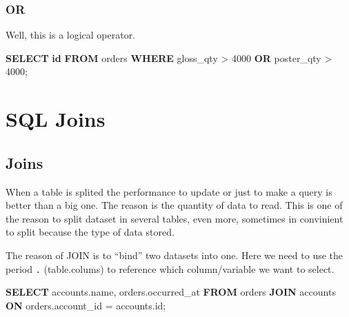 \documentclass[]{book}
\newenvironment{Shaded}{\begin{snugshade}}{\end{snugshade}}
\newcommand{\KeywordTok}[1]{\textcolor[rgb]{0.13,0.29,0.53}{\textbf{#1}}}
\newcommand{\DecValTok}[1]{\textcolor[rgb]{0.00,0.00,0.81}{#1}}
\newcommand{\StringTok}[1]{\textcolor[rgb]{0.31,0.60,0.02}{#1}}
\newcommand{\NormalTok}[1]{#1}
\begin{document}
\begin{Shaded}
\end{Shaded}

\subsubsection{OR}\label{or}

Well, this is a logical operator.

\begin{Shaded}
\begin{Highlighting}[]
\KeywordTok{SELECT} \KeywordTok{id}
\KeywordTok{FROM}\NormalTok{ orders}
\KeywordTok{WHERE}\NormalTok{ gloss_qty > }\DecValTok{4000} \KeywordTok{OR}\NormalTok{ poster_qty > }\DecValTok{4000}\NormalTok{;}
\end{Highlighting}
\end{Shaded}

\section{SQL Joins}\label{sql-joins}

\subsection{Joins}\label{joins}

When a table is splited the performance to update or just to make a
query is better than a big one. The reason is the quantity of data to
read. This is one of the reason to split dataset in several tables, even
more, sometimes in convinient to split because the type of data stored.

The reason of JOIN is to ``bind'' two datasets into one. Here we need to
use the period \texttt{.} (table.colums) to reference which
column/variable we want to select.

\begin{Shaded}
\begin{Highlighting}[]
\KeywordTok{SELECT}\NormalTok{ accounts.name, orders.occurred_at}
  \KeywordTok{FROM}\NormalTok{ orders}
\KeywordTok{JOIN}\NormalTok{ accounts}
\KeywordTok{ON}\NormalTok{ orders.account_id = accounts.id;}
\end{Highlighting}
\end{Shaded}
\end{document}
